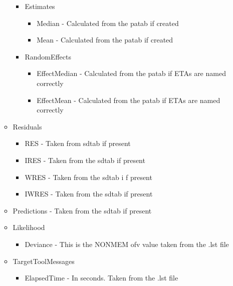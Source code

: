 \begin{itemize}
\begin{itemize}
            \begin{itemize}
                \item Estimates
                \begin{itemize}
                    \item Median - Calculated from the patab if created
                    \item Mean - Calculated from the patab if created
                \end{itemize}
                \item RandomEffects
                \begin{itemize}
                    \item EffectMedian - Calculated from the patab if ETAs are named correctly
                    \item EffectMean - Calculated from the patab if ETAs are named correctly
                \end{itemize}
            \end{itemize}
            \item Residuals
                \begin{itemize}
                    \item RES - Taken from sdtab if present
                    \item IRES - Taken from the sdtab if present
                    \item WRES - Taken from the sdtab i f present
                    \item IWRES - Taken from the sdtab if present
                \end{itemize}
            \item Predictions - Taken from the sdtab if present
            \item Likelihood
                \begin{itemize}
                    \item Deviance - This is the NONMEM ofv value taken from the .lst file
                \end{itemize}
            \item TargetToolMessages
                \begin{itemize}
                    \item ElapsedTime - In seconds. Taken from the .lst file
                \end{itemize}
        \end{itemize}
\end{itemize}



